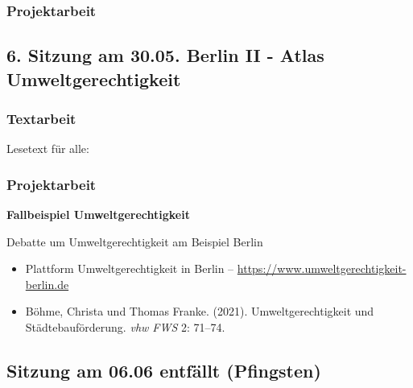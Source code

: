 \documentclass[
  ngerman,
]{article}
\providecommand{\tightlist}{%
  \setlength{\itemsep}{0pt}\setlength{\parskip}{0pt}}
\begin{document}
\hypertarget{projektarbeit-3}{%
\subsubsection*{Projektarbeit}\label{projektarbeit-3}}

\hypertarget{sitzung-am-30.05.-berlin-ii---atlas-umweltgerechtigkeit}{%
\subsection*{6. Sitzung am 30.05. \textbar{} Berlin II - Atlas Umweltgerechtigkeit}\label{sitzung-am-30.05.-berlin-ii---atlas-umweltgerechtigkeit}}

\hypertarget{textarbeit-5}{%
\subsubsection*{Textarbeit}\label{textarbeit-5}}

Lesetext für alle:

\hypertarget{projektarbeit-4}{%
\subsubsection*{Projektarbeit}\label{projektarbeit-4}}

\textbf{Fallbeispiel Umweltgerechtigkeit}

Debatte um Umweltgerechtigkeit am Beispiel Berlin

\begin{itemize}
\tightlist
\item
  Plattform Umweltgerechtigkeit in Berlin -- \url{https://www.umweltgerechtigkeit-berlin.de}
\item
  Böhme, Christa und Thomas Franke. (2021). Umweltgerechtigkeit und Städtebauförderung. \emph{vhw FWS} 2: 71--74.
\end{itemize}

\hypertarget{sitzung-am-06.06-entfuxe4llt-pfingsten}{%
\subsection*{Sitzung am 06.06 entfällt (Pfingsten)}\label{sitzung-am-06.06-entfuxe4llt-pfingsten}}
\end{document}
